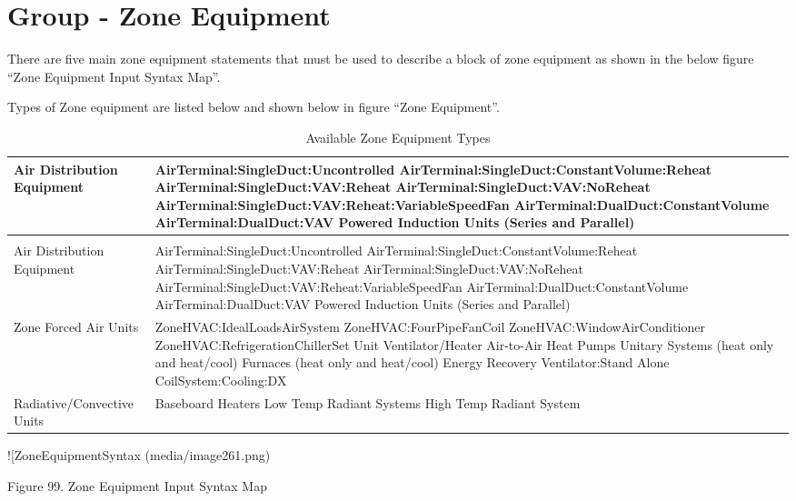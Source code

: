\section{Group - Zone Equipment}\label{group---zone-equipment}

There are five main zone equipment statements that must be used to describe a block of zone equipment as shown in the below figure ``Zone Equipment Input Syntax Map''.

Types of Zone equipment are listed below and shown below in figure ``Zone Equipment''.

\begin{longtable}[c]{p{1.5in}p{4.5in}}
\caption{Available Zone Equipment Types \label{table:available-zone-equipment-types}} \tabularnewline
\toprule 
Air Distribution Equipment & AirTerminal:SingleDuct:Uncontrolled    AirTerminal:SingleDuct:ConstantVolume:Reheat    AirTerminal:SingleDuct:VAV:Reheat    AirTerminal:SingleDuct:VAV:NoReheat    AirTerminal:SingleDuct:VAV:Reheat:VariableSpeedFan    AirTerminal:DualDuct:ConstantVolume    AirTerminal:DualDuct:VAV    Powered Induction Units (Series and Parallel) \tabularnewline
\midrule
\endfirsthead

\caption[]{Available Zone Equipment Types} \tabularnewline
\toprule 
Air Distribution Equipment & AirTerminal:SingleDuct:Uncontrolled    AirTerminal:SingleDuct:ConstantVolume:Reheat    AirTerminal:SingleDuct:VAV:Reheat    AirTerminal:SingleDuct:VAV:NoReheat    AirTerminal:SingleDuct:VAV:Reheat:VariableSpeedFan    AirTerminal:DualDuct:ConstantVolume    AirTerminal:DualDuct:VAV    Powered Induction Units (Series and Parallel) \tabularnewline
\midrule
\endhead

Zone Forced Air Units ~ & ZoneHVAC:IdealLoadsAirSystem    ZoneHVAC:FourPipeFanCoil    ZoneHVAC:WindowAirConditioner    ZoneHVAC:RefrigerationChillerSet    Unit Ventilator/Heater    Air-to-Air Heat Pumps    Unitary Systems (heat only and heat/cool)    Furnaces (heat only and heat/cool)    Energy Recovery Ventilator:Stand Alone    CoilSystem:Cooling:DX \tabularnewline
Radiative/Convective Units & Baseboard Heaters    Low Temp Radiant Systems    High Temp Radiant System \tabularnewline
\bottomrule
\end{longtable}

!{[}ZoneEquipmentSyntax (media/image261.png)

Figure 99. Zone Equipment Input Syntax Map

